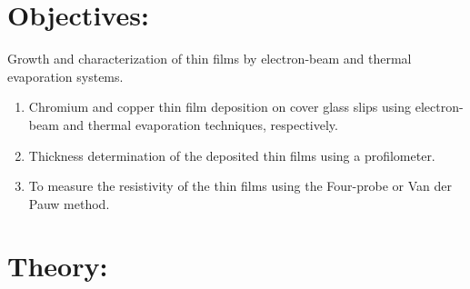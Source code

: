 \documentclass[]{report}[12 pt]
\begin{document}
	
	\section*{Objectives:}
	 Growth and characterization of thin films by electron-beam and thermal evaporation
	systems.
	\begin{enumerate}
	\item Chromium and copper thin film deposition on cover glass slips using electron-beam and
	thermal evaporation techniques, respectively.
	\item Thickness determination of the deposited thin films using a profilometer.
	\item To measure the resistivity of the thin films using the Four-probe or Van der Pauw
		method.
	\end{enumerate}
	\section*{Theory:}
\end{document}
